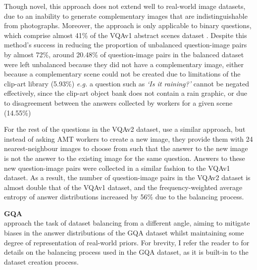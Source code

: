 Though novel, this approach does not extend well to real-world image datasets, due to an inability to generate complementary images that are indistinguishable from photographs. Moreover, the approach is only applicable to binary questions, which comprise almost 41\% of the VQAv1 abstract scenes dataset \cite{antol2015vqa}. Despite this method's success in reducing the proportion of unbalanced question-image pairs by almost 72\%, around 20.48\% of question-image pairs in the balanced dataset were left unbalanced because they did not have a complementary image, either because a complementary scene could not be created due to limitations of the clip-art library (5.93\%) \textit{e.g.} a question such as \textit{`Is it raining?'} cannot be negated effectively, since the clip-art object bank does not contain a rain graphic, or due to disagreement between the answers collected by workers for a given scene (14.55\%)

For the rest of the questions in the VQAv2 dataset, \citeauthor{goyal2017making} use a similar approach, but instead of asking AMT workers to create a new image, they provide them with 24 nearest-neighbour images to choose from such that the answer to the new image is not the answer to the existing image for the same question. Answers to these new question-image pairs were collected in a similar fashion to the VQAv1 dataset. As a result, the number of question-image pairs in the VQAv2 dataset is almost double that of the VQAv1 dataset, and the frequency-weighted average entropy of answer distributions increased by 56\% due to the balancing process.

\textbf{GQA}\\
\citeauthor{hudson2019gqa} approach the task of dataset balancing from a different angle, aiming to mitigate biases in the answer distributions of the GQA dataset whilst maintaining some degree of representation of real-world priors. For brevity, I refer the reader to \subsectionautorefname{ \ref{subsection:question_and_image_collection}} for details on the balancing process used in the GQA dataset, as it is built-in to the dataset creation process.


